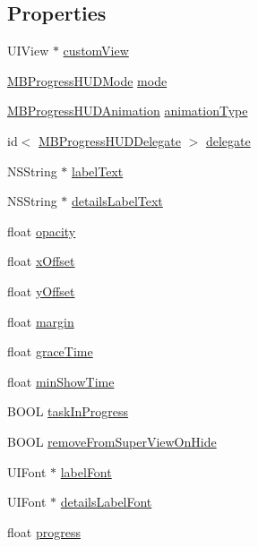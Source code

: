 \subsection*{Properties}
\begin{DoxyCompactItemize}
\item 
UIView $\ast$ \hyperlink{interface_m_b_progress_h_u_d_a3a6f62a10481ff864c43768214335413}{customView}
\item 
\hyperlink{_m_b_progress_h_u_d_8h_a553b6bab1602fa03257edde8491bb621}{MBProgressHUDMode} \hyperlink{interface_m_b_progress_h_u_d_a9eccf2d6fd3a3aee4df6e264de66b9b3}{mode}
\item 
\hyperlink{_m_b_progress_h_u_d_8h_a892ebf586d23b21a74bc54138ca25990}{MBProgressHUDAnimation} \hyperlink{interface_m_b_progress_h_u_d_a58c96d0d9d41e71d1f6e5490fa86fa96}{animationType}
\item 
id$<$ \hyperlink{protocol_m_b_progress_h_u_d_delegate-p}{MBProgressHUDDelegate} $>$ \hyperlink{interface_m_b_progress_h_u_d_a11525953bb5a88c09134de82a59bac22}{delegate}
\item 
NSString $\ast$ \hyperlink{interface_m_b_progress_h_u_d_a1d899875abfd1523c91b988113e6ecd1}{labelText}
\item 
NSString $\ast$ \hyperlink{interface_m_b_progress_h_u_d_ae16c349e909c11b26e72501ba1a13154}{detailsLabelText}
\item 
float \hyperlink{interface_m_b_progress_h_u_d_a6f4dca6b48529c4d3dade0e8d46f4e43}{opacity}
\item 
float \hyperlink{interface_m_b_progress_h_u_d_a4c9cc7a344711c6782bfad7ce9e12bb7}{xOffset}
\item 
float \hyperlink{interface_m_b_progress_h_u_d_a5193d79f9884fd5dad21aa7981429d16}{yOffset}
\item 
float \hyperlink{interface_m_b_progress_h_u_d_aea1419deaadb54e70abae7fe5aada09e}{margin}
\item 
float \hyperlink{interface_m_b_progress_h_u_d_ab22f44d31708d989ea3c1fe8452b13d2}{graceTime}
\item 
float \hyperlink{interface_m_b_progress_h_u_d_a776e5016e02affa05b3748fa6d975fd2}{minShowTime}
\item 
BOOL \hyperlink{interface_m_b_progress_h_u_d_a283d5cb9a069816a9a0406bc90d79a25}{taskInProgress}
\item 
BOOL \hyperlink{interface_m_b_progress_h_u_d_ae941fefd3aee82dc342657b52edb1e2b}{removeFromSuperViewOnHide}
\item 
UIFont $\ast$ \hyperlink{interface_m_b_progress_h_u_d_a4cfdebd008893a876603f2b234eb2ccd}{labelFont}
\item 
UIFont $\ast$ \hyperlink{interface_m_b_progress_h_u_d_af64b9ad0a4e509b96b9ffefc6f379b53}{detailsLabelFont}
\item 
float \hyperlink{interface_m_b_progress_h_u_d_ac7abb4766cd3f65c31f56279d7decff8}{progress}
\end{DoxyCompactItemize}


